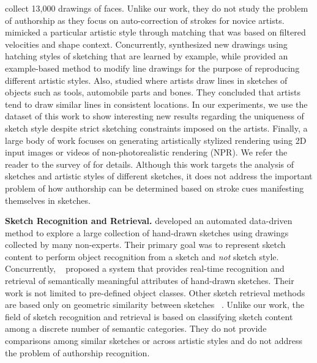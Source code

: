 \cite{Limpaecher:2013:RDA:2461912.2462016} collect 13,000 drawings of faces. Unlike our work, they do not study the problem of authorship as they focus on auto-correction of strokes for novice artists. \cite{Lu:2012:HES} mimicked a particular artistic style through matching that was based on filtered velocities and shape context. Concurrently, \cite{Kalogerakis:2012:mlhatching} synthesized new drawings using hatching styles of sketching that are learned by example, while  provided an example-based method to modify line drawings for the purpose of reproducing different artistic styles. Also,  studied where artists draw lines in sketches of objects such as tools, automobile parts and bones. They concluded that artists tend to draw similar lines in consistent locations. In our experiments, we use the dataset of this work to show interesting new results regarding the uniqueness of sketch style despite strict sketching constraints imposed on the artists. Finally, a large body of work focuses on generating artistically stylized rendering using 2D input images or videos of non-photorealistic rendering (NPR). We refer the reader to the survey of \cite{Kyprianidis:2013:TAS} for details. Although this work targets the analysis of sketches and artistic styles of different sketches, it does not address the important problem of how authorship can be determined based on stroke cues manifesting themselves in sketches. %


\noindent\textbf{Sketch Recognition and Retrieval.}
 developed an automated data-driven method to explore a large collection of hand-drawn sketches using drawings collected by many non-experts. Their primary goal was to represent sketch content to perform object recognition from a sketch and \emph{not} sketch style. Concurrently, ~\cite{Sun:2012:SAH:2393347.2396429} proposed a system that provides real-time recognition and retrieval of semantically meaningful attributes of hand-drawn sketches. Their work is not limited to pre-defined object classes. Other sketch retrieval methods are based only on geometric similarity between sketches ~\cite{Shrivastava:2011:DVS:2024156.2024188,5674030}. Unlike our work, the field of sketch recognition and retrieval is based on classifying sketch content among a discrete number of semantic categories. They do not provide comparisons among similar sketches or across artistic styles and do not address the problem of authorship recognition.

